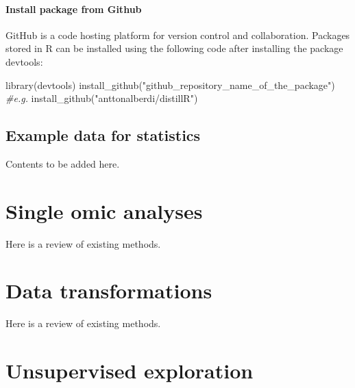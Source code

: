 \documentclass[
]{book}
\newenvironment{Shaded}{\begin{snugshade}}{\end{snugshade}}
\newcommand{\CommentTok}[1]{\textcolor[rgb]{0.56,0.35,0.01}{\textit{#1}}}
\newcommand{\FunctionTok}[1]{\textcolor[rgb]{0.00,0.00,0.00}{#1}}
\newcommand{\NormalTok}[1]{#1}
\newcommand{\StringTok}[1]{\textcolor[rgb]{0.31,0.60,0.02}{#1}}
\begin{document}
\hypertarget{install-package-from-github}{%
\subsubsection*{Install package from Github}\label{install-package-from-github}}

GitHub is a code hosting platform for version control and collaboration. Packages stored in R can be installed using the following code after installing the package devtools:

\begin{Shaded}
\begin{Highlighting}[]
\FunctionTok{library}\NormalTok{(devtools)}
\FunctionTok{install\_github}\NormalTok{(}\StringTok{"github\_repository\_name\_of\_the\_package"}\NormalTok{)}
\CommentTok{\#e.g.}
\FunctionTok{install\_github}\NormalTok{(}\StringTok{"anttonalberdi/distillR"}\NormalTok{)}
\end{Highlighting}
\end{Shaded}

\hypertarget{example-data-statistics}{%
\section{Example data for statistics}\label{example-data-statistics}}

Contents to be added here.

\hypertarget{single-omic-analyses}{%
\chapter{Single omic analyses}\label{single-omic-analyses}}

Here is a review of existing methods.

\hypertarget{data-transformations}{%
\chapter{Data transformations}\label{data-transformations}}

Here is a review of existing methods.

\hypertarget{unsupervised-exploration}{%
\chapter{Unsupervised exploration}\label{unsupervised-exploration}}
\end{document}
